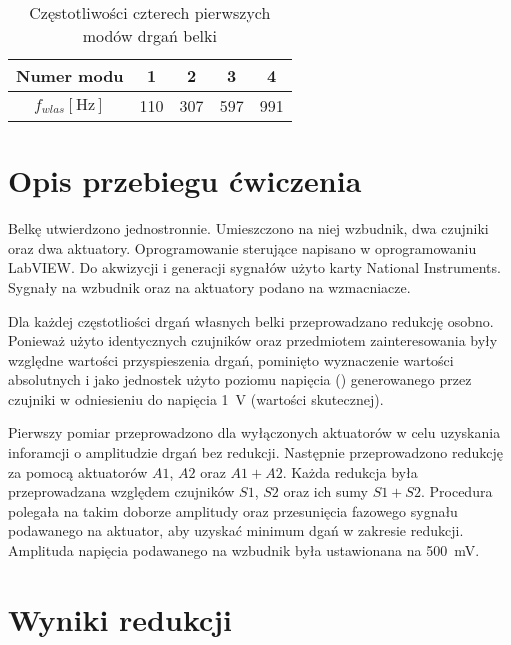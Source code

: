 \documentclass[polish,a4paper,11pt]{mwart}
\let\Oldsection\section
\renewcommand{\section}{\FloatBarrier\Oldsection}
\begin{document}
  \begin{table}[!tbh]
    \centering
    \caption{Częstotliwości czterech pierwszych modów drgań belki}
    \begin{tabular}{|c|c|c|c|c|}
      \hline
      Numer modu & 1 & 2 & 3 & 4 \\
      \hline
      $f_{wlas} [\si{\hertz}]$ & 110 & 307 & 597 & 991 \\
      \hline
    \end{tabular}
    \label{tab:fwlas}
  \end{table}

  \section{Opis przebiegu ćwiczenia}

  Belkę utwierdzono jednostronnie. Umieszczono na niej wzbudnik, dwa czujniki
  oraz dwa aktuatory. Oprogramowanie sterujące napisano w oprogramowaniu
  LabVIEW\textregistered. Do akwizycji i generacji sygnałów użyto karty
  National Instruments\textregistered. Sygnały na wzbudnik oraz na aktuatory
  podano na wzmacniacze. 

  Dla każdej częstotliości drgań własnych belki przeprowadzano redukcję osobno.
  Ponieważ użyto identycznych czujników oraz przedmiotem zainteresowania były
  względne wartości przyspieszenia drgań, pominięto wyznaczenie wartości
  absolutnych i jako jednostek użyto poziomu napięcia (\si{\decibelV})
  generowanego przez czujniki w odniesieniu do napięcia \SI{1}{\volt} (wartości
  skutecznej). 

  Pierwszy pomiar przeprowadzono dla wyłączonych aktuatorów w celu uzyskania
  inforamcji o amplitudzie drgań bez redukcji. Następnie przeprowadzono
  redukcję za pomocą aktuatorów $A1$, $A2$ oraz $A1+A2$. Każda redukcja była
  przeprowadzana względem czujników $S1$, $S2$ oraz ich sumy $S1+S2$.
  Procedura polegała na takim doborze amplitudy oraz
  przesunięcia fazowego sygnału podawanego na aktuator, aby uzyskać minimum
  dgań w zakresie redukcji. Amplituda napięcia podawanego na wzbudnik była
  ustawionana na \SI{500}{\milli\volt}.

  \section{Wyniki redukcji}
  
\end{document}
